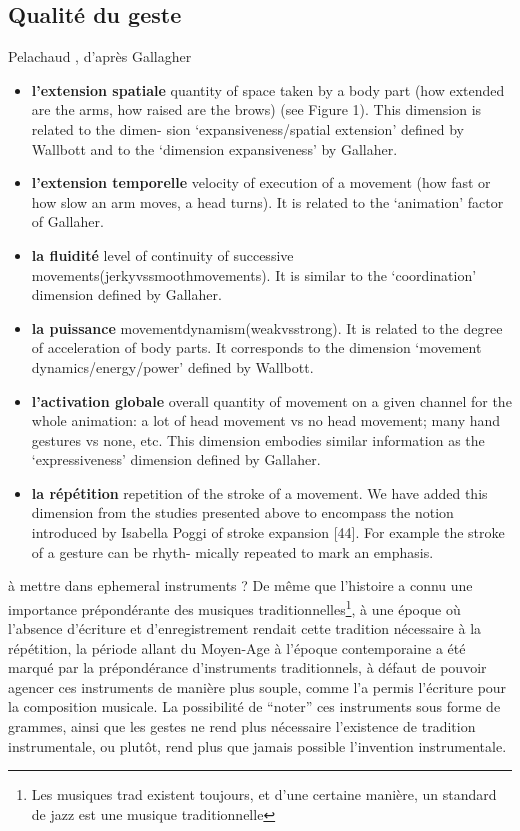 \subsection{Qualité du geste}
Pelachaud \cite{pelachaud_studies_2009}, d'après Gallagher \cite{gallaher_individual_1992}
\vspace{-1em}
\begin{itemize}[noitemsep]
	\item \textbf{l'extension spatiale} quantity of space taken by a body part (how extended are the arms, how raised are the brows) (see Figure 1). This dimension is related to the dimen- sion ‘expansiveness/spatial extension’ defined by Wallbott and to the ‘dimension expansiveness’ by Gallaher.
	\item \textbf{l'extension temporelle} velocity of execution of a movement (how fast or how slow an arm moves, a head turns). It is related to the ‘animation’ factor of Gallaher.
	\item \textbf{la fluidité} level of continuity of successive movements(jerkyvssmoothmovements). It is similar to the ‘coordination’ dimension defined by Gallaher.
	\item \textbf{la puissance} movementdynamism(weakvsstrong). It is related to the degree of acceleration of body parts. It corresponds to the dimension ‘movement dynamics/energy/power’ defined by Wallbott.
	\item \textbf{l'activation globale} overall quantity of movement on a given channel for the whole animation: a lot of head movement vs no head movement; many hand gestures vs none, etc. This dimension embodies similar information as the ‘expressiveness’ dimension defined by Gallaher.
	\item \textbf{la répétition} repetition of the stroke of a movement. We have added this dimension from the studies presented above to encompass the notion introduced by Isabella Poggi of stroke expansion [44]. For example the stroke of a gesture can be rhyth- mically repeated to mark an emphasis.
\end{itemize}



à mettre dans ephemeral instruments ?
De même que l'histoire a connu une importance prépondérante des musiques traditionnelles\footnote{Les musiques trad existent toujours, et d'une certaine manière, un standard de jazz est une musique traditionnelle}, à une époque où l'absence d'écriture et d'enregistrement rendait cette tradition nécessaire à la répétition, la période allant du Moyen-Age à l'époque contemporaine a été marqué par la prépondérance d'instruments traditionnels, à défaut de pouvoir agencer ces instruments de manière plus souple, comme l'a permis l'écriture pour la composition musicale. La possibilité de ``noter'' ces instruments sous forme de grammes, ainsi que les gestes ne rend plus nécessaire l'existence de tradition instrumentale, ou plutôt, rend plus que jamais possible l'invention instrumentale.

